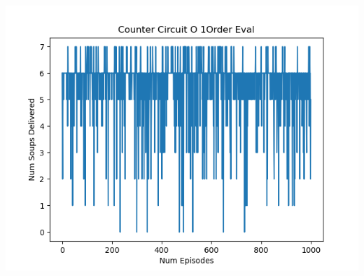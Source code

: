 \documentclass[conference]{IEEEtran}
\begin{document}
\includegraphics[scale=0.5]{countercircuit_eval.png}
\end{document}
